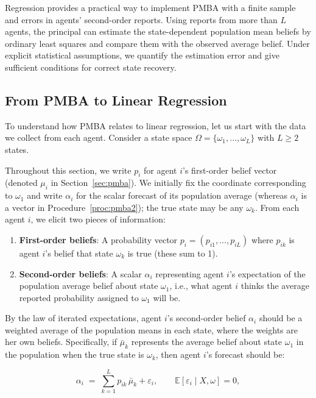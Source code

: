 \documentclass[12pt,reqno]{amsart}
\begin{document}
Regression provides a practical way to implement PMBA with a finite sample and errors in agents' second-order reports. Using reports from more than $L$ agents, the principal can estimate the state-dependent population mean beliefs by ordinary least squares and compare them with the observed average belief. Under explicit statistical assumptions, we quantify the estimation error and give sufficient conditions for correct state recovery.





\subsection{From PMBA to Linear Regression}

To understand how PMBA relates to linear regression, let us start with the
data we collect from each agent. Consider a state space $\Omega=\{\omega_1,%
\dots,\omega_L\}$ with $L\ge 2$ states.

Throughout this section, we write $p_i$ for agent $i$'s first-order belief vector (denoted $\mu_i$ in Section~\ref{sec:pmba}). We initially fix the coordinate corresponding to $\omega_1$ and write $\alpha_i$ for the scalar forecast of its population average (whereas $\alpha_i$ is a vector in Procedure~\ref{proc:pmba2}); the true state may be any $\omega_k$. From each agent $i$, we elicit two pieces of information:

\begin{enumerate}
\item \textbf{First-order beliefs}: A probability vector $%
p_i=(p_{i1},\dots,p_{iL})$ where $p_{ik}$ is agent $i$'s belief that state $%
\omega_k$ is true (these sum to 1).

\item \textbf{Second-order beliefs}: A scalar $\alpha_i$
representing agent $i$'s expectation of the population average belief about
state $\omega_1$, i.e., what agent $i$ thinks the average reported
probability assigned to $\omega_1$ will be.
\end{enumerate}

 By the law of iterated expectations, agent $i$'s second-order belief $\alpha_i$ should be
a weighted average of the population means in each state, where the weights
are her own beliefs. Specifically, if $\bar\mu_k$ represents the average
belief about state $\omega_1$ in the population when the true state is $%
\omega_k$, then agent $i$'s forecast should be:

\begin{equation}
\alpha_i \;=\; \sum_{k=1}^{L} p_{ik}\,\bar\mu_k + \varepsilon_i, \qquad
\mathbb{E}[\varepsilon_i\mid X,\omega]=0,  \label{eq:struct_LR_multi}
\end{equation}
\end{document}
